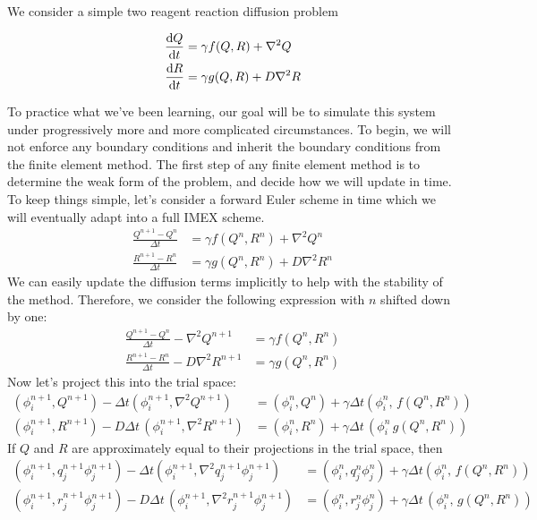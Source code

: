 \documentclass{article}
\begin{document}
We consider a simple two reagent reaction diffusion problem

\begin{align}
    \diff{Q}{t} &= \gamma f(Q,R) + \nabla^2 Q\\
    \diff{R}{t} &= \gamma g(Q,R) + D\nabla^2 R
\end{align}

To practice what we've been learning, our goal will be to simulate this system
under progressively more and more complicated circumstances. To begin, we will
not enforce any boundary conditions and inherit the boundary conditions from
the finite element method. The first step of any finite element method is to 
determine the weak form of the problem, and decide how we will update in time.
To keep things simple, let's consider a forward Euler scheme in time which we 
will eventually adapt into a full IMEX scheme.
\begin{align}
    \frac{Q^{n+1}-Q^n}{\Delta t} &= \gamma f(Q^n, R^n) + \nabla^2 Q^n\\
    \frac{R^{n+1}-R^n}{\Delta t} &= \gamma g(Q^n, R^n) + D\nabla^2 R^n
\end{align}
We can easily update the diffusion terms implicitly to help with the stability
of the method. Therefore, we consider the following expression with $n$ shifted
down by one:
\begin{align}
    \frac{Q^{n+1}-Q^{n}}{\Delta t} - \nabla^2 Q^{n+1}  &= \gamma f(Q^{n}, R^{n})\\
    \frac{R^{n+1}-R^{n}}{\Delta t} - D\nabla^2 R^{n+1} &= \gamma g(Q^{n}, R^{n})
\end{align}
Now let's project this into the trial space:
\begin{align}
    (\phi_i^{n+1}, Q^{n+1}) - \Delta t (\phi_i^{n+1}, \nabla^2 Q^{n+1})
    &= (\phi_i^n, Q^{n}) + \gamma \Delta t (\phi_i^{n},\, f(Q^{n}, R^{n}))\\
    (\phi_i^{n+1}, R^{n+1}) - D\Delta t\, (\phi_i^{n+1},\nabla^2 R^{n+1})
    &= (\phi_i^n, R^{n}) + \gamma \Delta t\, (\phi_i^{n}\, g(Q^{n}, R^{n}))
\end{align}
If $Q$ and $R$ are approximately equal to their projections in the trial space,
then
\begin{align}
    (\phi_i^{n+1}, q_j^{n+1}\phi_j^{n+1}) - \Delta t (\phi_i^{n+1}, \nabla^2 q_j^{n+1} \phi_j^{n+1})
    &= (\phi_i^{n}, q_j^{n}\phi_j^{n}) + \gamma \Delta t (\phi_i^{n},\, f(Q^{n}, R^{n}))\\
    (\phi_i^{n+1}, r_j^{n+1} \phi_j^{n+1}) - D\Delta t\, (\phi_i^{n+1},\nabla^2 r_j^{n+1}\phi_j^{n+1})
    &= (\phi_i^n, r_j^{n}\phi_j^{n}) + \gamma \Delta t\, (\phi_i^{n},\, g(Q^{n}, R^{n}))
\end{align}
\end{document}
